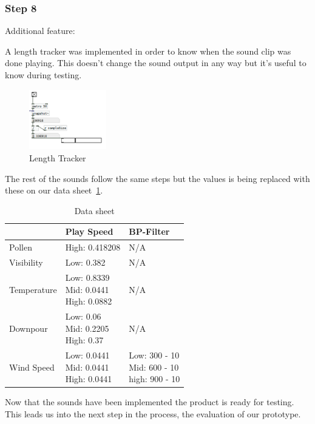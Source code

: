 
\FloatBarrier
\subsubsection*{Step 8} %
\label{ssub:step_8}

Additional feature:

A length tracker was implemented in order to know when the sound clip was done playing. 
This doesn’t change the sound output in any way but it’s useful to know during testing.

\begin{figure}[!htbp]
    \centering
    \includegraphics[width=0.3\textwidth]{images/Implementation10.png}
    \caption{Length Tracker}
    \label{fig:implementation10}
\end{figure}

\FloatBarrier

The rest of the sounds follow the same steps but the values is being replaced with these on our data sheet~\ref{tab:data_sheet}.

\begin{table}[!ht]
\centering
\begin{tabular}{l | l | l}
 & Play Speed & BP-Filter \\
\hline
Pollen & High: 0.418208 & N/A \\
\hline
Visibility & Low: 0.382 & N/A \\
\hline
Temperature & \specialcell{Low: 0.8339 \\ Mid: 0.0441 \\ High: 0.0882} & N/A \\
\hline
Downpour & \specialcell{Low: 0.06 \\ Mid: 0.2205 \\ High: 0.37} & N/A \\
\hline
Wind Speed & \specialcell{Low: 0.0441 \\ Mid: 0.0441 \\ High: 0.0441} & \specialcell{Low: 300 - 10 \\ Mid: 600 - 10 \\ high: 900 - 10}
\end{tabular}
\caption{Data sheet}
\label{tab:data_sheet}
\end{table}

Now that the sounds have been implemented the product is ready for testing. 
This leads us into the next step in the process, the evaluation of our prototype.

